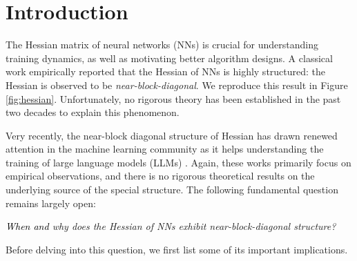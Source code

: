 \documentclass{article}
\newcommand{\1}{^{(1)}}
\newcommand{\2}{^{(2)}}
\newcommand{\yushunrevise}[1]{\textcolor{black}{ #1}}
\begin{document}
\section{Introduction}



The Hessian matrix of neural networks (NNs) is crucial for understanding training dynamics, as well as motivating better algorithm designs.
A classical work \citep{collobert2004large} empirically reported that the Hessian of NNs is highly structured: the Hessian is observed to be {\it near-block-diagonal}.
We reproduce this result in Figure \ref{fig:hessian}. 
Unfortunately, no rigorous theory has been established in the past two decades to explain this phenomenon.  

Very recently, the near-block diagonal structure of Hessian has drawn renewed attention in the machine learning community as it helps understanding the training of large language models (LLMs)
\citep{zhang2024transformers,zhang2024adam,kunstner2024heavy}.
Again, these works primarily focus on empirical observations, 
and there is no rigorous theoretical results on the underlying source of the special structure. 
The following fundamental question remains largely open:

\begin{center}
{\it \yushunrevise{When and} why does the Hessian of NNs exhibit near-block-diagonal structure? }
\end{center}


Before delving into this question, we first list some of its important implications.
\end{document}
